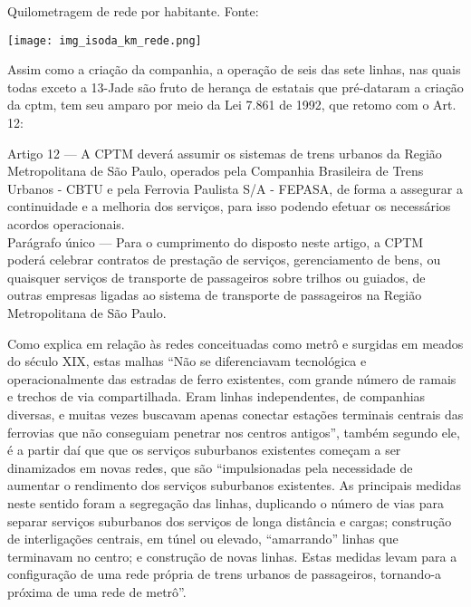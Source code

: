 \documentclass[11pt,fleqn]{book} %
\begin{document}
\begin{table}[h]
	\caption{Quilometragem de rede por habitante. Fonte: \cite[p. 58]{Isoda}}
	\texttt{[image: img\_isoda\_km\_rede.png]}
	\label{tab:isoda_km}
\end{table}

Assim como a criação da companhia, a operação de seis das sete linhas, nas quais todas exceto a 13-Jade são fruto de herança de estatais que pré-dataram a criação da {\glsdesc*{cptm}}, tem seu amparo por meio da Lei 7.861 de 1992, que retomo com o Art. 12:

\begin{citacao}
	Artigo 12 --- A CPTM deverá assumir os sistemas de trens urbanos da Região Metropolitana de São Paulo, operados pela Companhia Brasileira de Trens Urbanos - CBTU e pela Ferrovia Paulista S/A - FEPASA, de forma a assegurar a continuidade e a melhoria dos serviços, para isso podendo efetuar os necessários acordos operacionais.\\
	Parágrafo único --- Para o cumprimento do disposto neste artigo, a CPTM poderá celebrar contratos de prestação de serviços, gerenciamento de bens, ou quaisquer serviços de transporte de passageiros sobre trilhos ou guiados, de outras empresas ligadas ao sistema de transporte de passageiros na Região Metropolitana de São Paulo.\cite{lei7861}
\end{citacao}

Como explica \cite[pág. 30]{Isoda} em relação às redes conceituadas como metrô e surgidas em meados do século XIX, estas malhas ``Não se diferenciavam tecnológica e operacionalmente das estradas de ferro  existentes,  com  grande  número  de  ramais  e  trechos  de  via compartilhada. Eram linhas independentes, de companhias diversas, e muitas  vezes  buscavam  apenas  conectar  estações  terminais  centrais das ferrovias que não conseguiam penetrar nos centros antigos'', também segundo ele, é a partir daí que que os serviços suburbanos existentes começam a ser dinamizados em novas redes, que são ``impulsionadas  pela  necessidade  de  aumentar  o  rendimento  dos serviços  suburbanos  existentes.  As  principais  medidas  neste  sentido foram  a  segregação  das  linhas,  duplicando  o  número  de  vias  para separar serviços suburbanos dos serviços de longa distância e  cargas; construção  de  interligações  centrais,  em  túnel  ou  elevado, “amarrando” linhas que terminavam no centro; e construção de novas linhas. Estas medidas levam para a configuração de uma rede própria de trens urbanos de passageiros, tornando-a próxima de uma rede de metrô''\cite[pág. 32]{Isoda}.
	
\end{document}
